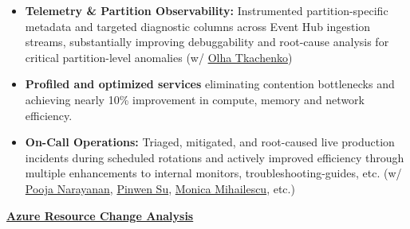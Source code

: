 \documentclass[a4paper,11pt]{article}
\begin{document}
\begin{itemize}[label=\tiny$\circ$, leftmargin=1em, itemsep=1.0mm]
        \item \textbf{Telemetry \& Partition Observability:} Instrumented partition-specific metadata and targeted diagnostic columns across Event Hub ingestion streams, substantially improving debuggability and root-cause analysis for critical partition-level anomalies (w/ \href{https://www.linkedin.com/in/olha-tkachenko-8b2b28109/}{Olha Tkachenko})
        \item \textbf{Profiled and optimized services} eliminating contention bottlenecks and achieving nearly 10\% improvement in compute, memory and network efficiency.
        \item \textbf{On-Call Operations:} Triaged, mitigated, and root-caused live production incidents during scheduled rotations and actively improved efficiency through multiple enhancements to internal monitors, troubleshooting-guides, etc. (w/ 
        \href{https://www.linkedin.com/in/pooja-narayanan-sivagaminathan/}{Pooja Narayanan},
        \href{https://www.linkedin.com/in/pinwen-su/}{Pinwen Su},
        \href{https://www.linkedin.com/in/monica-m-64077aa6/}{Monica Mihailescu},  etc.)
    \end{itemize}
    \vspace{2mm}    
    \item {\href{https://learn.microsoft.com/en-us/azure/governance/resource-graph/changes/resource-graph-changes}{\textbf{Azure Resource Change Analysis}}}
\end{document}
